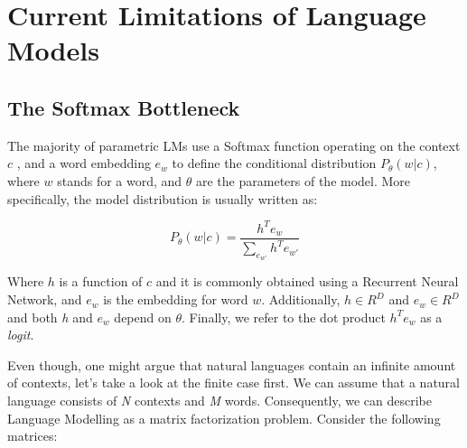 \chapter{Current Limitations of Language Models}
\label{chapter:limitations}

\section{The Softmax Bottleneck}
\label{section:limitations:softmax_bottleneck}

The majority of parametric LMs use a Softmax function operating on the context $ c $ , and a word embedding $ e_w $ to define the conditional distribution $ P_\theta(w|c) $, where $ w $ stands for a word, and $ \theta $ are the parameters of the model. More specifically, the model distribution is usually written as:

\begin{displaymath}
    P_\theta(w | c) = \frac{h^Te_w}{\sum_{e_{w'}} h^Te_{w'}}
\end{displaymath}

Where $ h $ is a function of $ c $ and it is commonly obtained using a Recurrent Neural Network, and $ e_w $ is the embedding for word $ w $. Additionally, $ h \in R^D $ and $ e_w \in R^D $ and both \emph{h} and $ e_w $ depend on $ \theta $. Finally, we refer to the dot product $ h^Te_w $ as a \emph{logit}.

Even though, one might argue that natural languages contain an infinite amount of contexts, let's take a look at the finite case first. We can assume that a natural language consists of \emph{N} contexts and \emph{M} words. Consequently, we can describe Language Modelling as a matrix factorization problem. Consider the following matrices:

